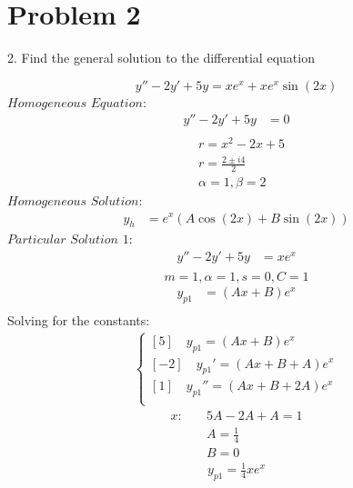 \documentclass{article}
\begin{document}
    \section{Problem 2}
    \begin{flushleft}
        2. Find the general solution to the differential equation
    \end{flushleft}
    \begin{equation}
        y'' - 2y' + 5y = xe^{x} + xe^{x}\sin{(2x)}
    \end{equation}
    $Homogeneous$ $Equation:$
    \begin{align*}
        y'' - 2y' + 5y &= 0 \\
    \end{align*}
    \begin{align*}
        &r = x^{2} - 2x + 5 \\
        &r = \frac{2 \pm i4}{2} \\
        &\alpha = 1, \beta = 2
    \end{align*}
        $Homogeneous$ $Solution:$
    \begin{align*}
        y_{h} &= e^{x}(A\cos{(2x)} + B\sin{(2x)}) 
    \end{align*}    
    $Particular$ $Solution$ $1:$
    \begin{align*}
        y'' - 2y' + 5y &= xe^{x}\\
    \end{align*}
        $$m = 1, \alpha = 1, s = 0, C = 1$$
    \begin{align*}
        y_{p1} &= (Ax + B)e^{x} \\
    \end{align*}
        Solving for the constants:
    \begin{align*}
        \begin{cases}
            [5] \quad y_{p1} = (Ax + B)e^{x} \\
            [-2] \quad y_{p1}' = (Ax + B + A)e^{x} \\
            [1] \quad y_{p1}'' = (Ax + B + 2A)e^{x} \\
        \end{cases}
    \end{align*}
    \begin{align*}
        x: \quad & 5A -2A + A = 1 \\
        & A = \frac{1}{4} \\
        &B = 0
    \end{align*}
    \begin{align*}
        y_{p1} = \frac{1}{4}xe^{x} \\
    \end{align*}
\end{document}
